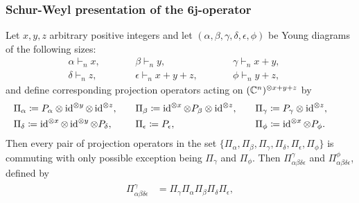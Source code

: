 \documentclass[notitlepage, 10pt]{article}
\begin{document}
\subsubsection{Schur-Weyl presentation of the \texorpdfstring{$\boldsymbol{6j}$}{6j}-operator}

\begin{lem}
    \label{lem:schur_weyl_presentation}
    Let $x,y,z$ arbitrary positive integers and let $(\alpha, \beta, \gamma, \delta, \epsilon, \phi)$ be Young diagrams of the following sizes:
    \begin{equation}
        \label{eq:xyz_sized_young_diagrams}
        \begin{alignedat}{3}
             &\alpha \vdash_{n} x, \qquad 
            &&\beta \vdash_{n} y, \qquad
            &&\gamma \vdash_{n} x+y, \qquad\\
             &\delta \vdash_{n} z, \qquad
            &&\epsilon \vdash_{n} x+y+z, \qquad
            &&\phi \vdash_{n} y+z,
        \end{alignedat}
    \end{equation}
    and define corresponding projection operators acting on $(\mathbb C^{n})^{\otimes x+y+z}$ by
    \begin{equation}
        \label{eq:extended_projs}
        \begin{alignedat}{3}
            &\Pi_{\alpha} \coloneqq P_{\alpha} \otimes \operatorname{id}^{\otimes y} \otimes \operatorname{id}^{\otimes z}, \qquad 
            &&\Pi_{\beta} \coloneqq \operatorname{id}^{\otimes x} \otimes P_{\beta} \otimes \operatorname{id}^{\otimes z}, \qquad
            &&\Pi_{\gamma} \coloneqq P_{\gamma} \otimes \operatorname{id}^{\otimes z}, \qquad\\
             &\Pi_{\delta} \coloneqq \operatorname{id}^{\otimes x} \otimes \operatorname{id}^{\otimes y} \otimes P_{\delta}, \qquad
            &&\Pi_{\epsilon} \coloneqq P_{\epsilon}, \qquad
            &&\Pi_{\phi} \coloneqq \operatorname{id}^{\otimes x} \otimes P_{\phi}.
        \end{alignedat}
    \end{equation}
    Then every pair of projection operators in the set $\{\Pi_{\alpha}, \Pi_{\beta}, \Pi_{\gamma}, \Pi_{\delta}, \Pi_{\epsilon}, \Pi_{\phi}\}$ is commuting with only possible exception being $\Pi_{\gamma}$ and $\Pi_{\phi}$.
    Then $\Pi^{\gamma}_{\alpha\beta\delta\epsilon}$ and $\Pi^{\phi}_{\alpha\beta\delta\epsilon}$, defined by
    \begin{align}
        \label{eq:commuting_extended_projs}
        \begin{split}
            \Pi^{\gamma}_{\alpha\beta\delta\epsilon} &= \Pi_{\gamma}\Pi_{\alpha}\Pi_{\beta}\Pi_{\delta}\Pi_{\epsilon},\\

\end{split}
\end{align}
\end{lem}
\end{document}
